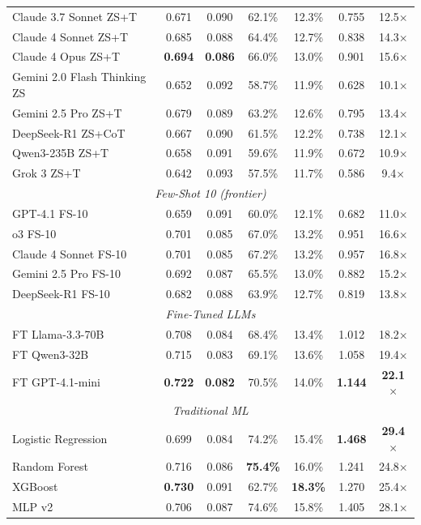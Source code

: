 \documentclass[11pt, a4paper]{article}
\begin{document}
\begin{table}[H]
\begin{tabular}{@{}lcccccc@{}}
Claude 3.7 Sonnet ZS+T      & 0.671 & 0.090 & 62.1\% & 12.3\% & 0.755 & 12.5$\times$\\
Claude 4 Sonnet ZS+T        & 0.685 & 0.088 & 64.4\% & 12.7\% & 0.838 & 14.3$\times$\\
Claude 4 Opus ZS+T          & \bf 0.694 & \bf 0.086 & 66.0\% & 13.0\% & 0.901 & 15.6$\times$\\
Gemini 2.0 Flash Thinking ZS & 0.652 & 0.092 & 58.7\% & 11.9\% & 0.628 & 10.1$\times$\\
Gemini 2.5 Pro ZS+T         & 0.679 & 0.089 & 63.2\% & 12.6\% & 0.795 & 13.4$\times$\\
DeepSeek-R1 ZS+CoT          & 0.667 & 0.090 & 61.5\% & 12.2\% & 0.738 & 12.1$\times$\\
Qwen3-235B ZS+T            & 0.658 & 0.091 & 59.6\% & 11.9\% & 0.672 & 10.9$\times$\\
Grok 3 ZS+T                & 0.642 & 0.093 & 57.5\% & 11.7\% & 0.586 & 9.4$\times$\\
\midrule
\multicolumn{7}{c}{\textit{Few-Shot 10 (frontier)}}\\
GPT-4.1 FS-10              & 0.659 & 0.091 & 60.0\% & 12.1\% & 0.682 & 11.0$\times$\\
o3 FS-10                  & 0.701 & 0.085 & 67.0\% & 13.2\% & 0.951 & 16.6$\times$\\
Claude 4 Sonnet FS-10       & 0.701 & 0.085 & 67.2\% & 13.2\% & 0.957 & 16.8$\times$\\
Gemini 2.5 Pro FS-10        & 0.692 & 0.087 & 65.5\% & 13.0\% & 0.882 & 15.2$\times$\\
DeepSeek-R1 FS-10          & 0.682 & 0.088 & 63.9\% & 12.7\% & 0.819 & 13.8$\times$\\
\midrule
\multicolumn{7}{c}{\textit{Fine-Tuned LLMs}}\\
FT Llama-3.3-70B            & 0.708 & 0.084 & 68.4\% & 13.4\% & 1.012 & 18.2$\times$\\
FT Qwen3-32B               & 0.715 & 0.083 & 69.1\% & 13.6\% & 1.058 & 19.4$\times$\\
FT GPT-4.1-mini            & \bf 0.722 & \bf 0.082 & 70.5\% & 14.0\% & \bf 1.144 & \bf 22.1$\times$\\
\midrule
\multicolumn{7}{c}{\textit{Traditional ML}}\\
Logistic Regression       & 0.699 & \cellcolor{best}0.084 & 74.2\% & 15.4\% & \cellcolor{best}\bf 1.468 & \cellcolor{best}\bf 29.4$\times$\\
Random Forest             & 0.716 & 0.086 & \bf 75.4\% & 16.0\% & 1.241 & 24.8$\times$\\
XGBoost                   & \bf 0.730 & 0.091 & 62.7\% & \bf 18.3\% & 1.270 & 25.4$\times$\\
MLP v2                    & 0.706 & 0.087 & 74.6\% & 15.8\% & 1.405 & 28.1$\times$\\
\bottomrule
\end{tabular}
\end{table}
\end{document}
